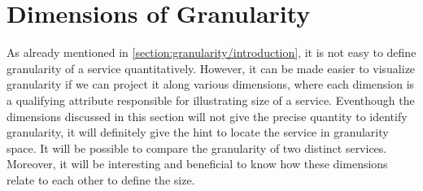 \section{Dimensions of Granularity}\label{section:granularity/dimensions}
As already mentioned in \ref{section:granularity/introduction}, it is not easy to define granularity of a service quantitatively. However, it can be made easier to visualize granularity if we can project it along various dimensions, where each dimension is a qualifying attribute responsible for illustrating size of a service. Eventhough the  dimensions discussed in this section will not give the precise quantity to identify granularity, it will definitely give the hint to locate the service in granularity space. It will be possible to compare the granularity of two distinct services. Moreover, it will be interesting and beneficial to know how these dimensions relate to each other to define the size.

